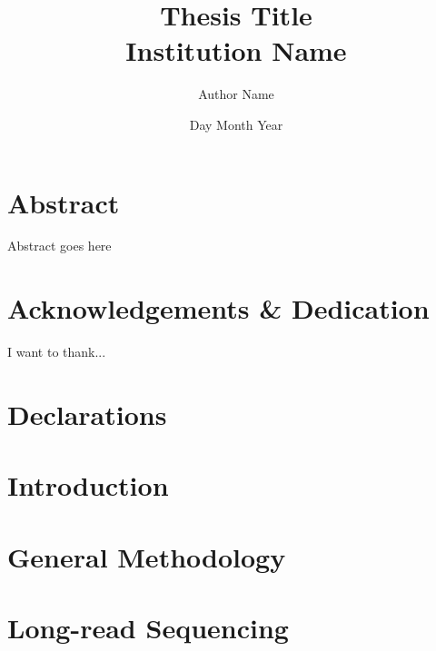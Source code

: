 \documentclass[a4paper,12pt,oneside]{report}
\begin{document}
\sloppy %
\title{
	{Thesis Title}\\
	{\large Institution Name}\\}
\author{Author Name}
\date{Day Month Year}

\normallinespacing
\maketitle
\pagestyle{plain} %

\chapter*{Abstract}
Abstract goes here

\chapter*{Acknowledgements \& Dedication}
I want to thank...

\newpage
\tableofcontents

\newpage
\listoffigures
{}

\newpage
\listoftables
{}

\newpage

\chapter*{Declarations}


\newpage
\renewcommand{\nomname}{Abbreviations}
\printnomenclature 

\chapter{Introduction}
%

\chapter{General Methodology}\label{ch: general methodology}
%

\chapter{Long-read Sequencing}\label{ch: long_read_sequencing}







\end{document}
